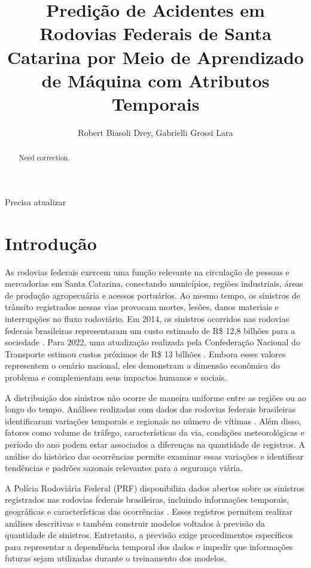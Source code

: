 \documentclass[12pt]{article}
\title{Predição de Acidentes em Rodovias Federais de Santa Catarina por Meio de Aprendizado de Máquina com Atributos Temporais}
\author{Robert Biasoli Drey\inst{1}, Gabrielli Grossi Lara\inst{1}}
\begin{document}
\maketitle

\begin{abstract}
Need correction.

\end{abstract}

\begin{resumo}
Precisa atualizar

\end{resumo}

\section{Introdução}

As rodovias federais exercem uma função relevante na circulação de pessoas e mercadorias em Santa Catarina, conectando municípios, regiões industriais, áreas de produção agropecuária e acessos portuários. Ao mesmo tempo, os sinistros de trânsito registrados nessas vias provocam mortes, lesões, danos materiais e interrupções no fluxo rodoviário. Em 2014, os sinistros ocorridos nas rodovias federais brasileiras representaram um custo estimado de R\$ 12,8 bilhões para a sociedade \cite{ipea2015acidentes}. Para 2022, uma atualização realizada pela Confederação Nacional do Transporte estimou custos próximos de R\$ 13 bilhões \cite{cnt2023acidentes}. Embora esses valores representem o cenário nacional, eles demonstram a dimensão econômica do problema e complementam seus impactos humanos e sociais.

A distribuição dos sinistros não ocorre de maneira uniforme entre as regiões ou ao longo do tempo. Análises realizadas com dados das rodovias federais brasileiras identificaram variações temporais e regionais no número de vítimas \cite{moraisneto2021tendencia}. Além disso, fatores como volume de tráfego, características da via, condições meteorológicas e período do ano podem estar associados a diferenças na quantidade de registros. A análise do histórico das ocorrências permite examinar essas variações e identificar tendências e padrões sazonais relevantes para a segurança viária.

A Polícia Rodoviária Federal (PRF) disponibiliza dados abertos sobre os sinistros registrados nas rodovias federais brasileiras, incluindo informações temporais, geográficas e características das ocorrências \cite{prf2026dados}. Esses registros permitem realizar análises descritivas e também construir modelos voltados à previsão da quantidade de sinistros. Entretanto, a previsão exige procedimentos específicos para representar a dependência temporal dos dados e impedir que informações futuras sejam utilizadas durante o treinamento dos modelos.
\end{document}
